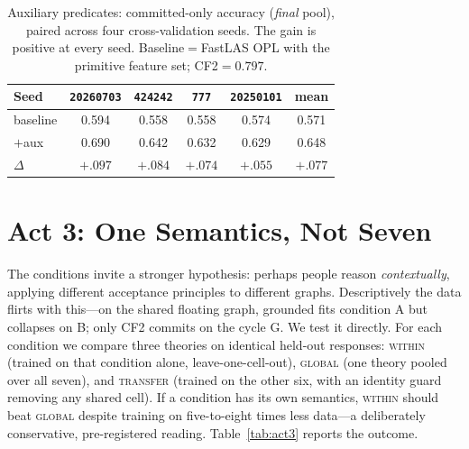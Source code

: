 \documentclass[11pt]{article}
\newcommand{\best}[1]{\textbf{#1}}
\begin{document}
\begin{table}[t]
\centering
\small
\caption{Auxiliary predicates: committed-only accuracy (\emph{final} pool), paired across four
cross-validation seeds. The gain is positive at every seed. Baseline$=$FastLAS OPL with the primitive
feature set; CF2$=0.797$.}
\label{tab:aux}
\begin{tabular}{lccccc}
\toprule
Seed & \texttt{20260703} & \texttt{424242} & \texttt{777} & \texttt{20250101} & mean\\
\midrule
baseline & 0.594 & 0.558 & 0.558 & 0.574 & 0.571\\
$+$aux   & 0.690 & 0.642 & 0.632 & 0.629 & 0.648\\
\midrule
$\Delta$ & $+.097$ & $+.084$ & $+.074$ & $+.055$ & \best{$+.077$}\\
\bottomrule
\end{tabular}
\end{table}

\section{Act 3: One Semantics, Not Seven}
\label{sec:act3}

The conditions invite a stronger hypothesis: perhaps people reason \emph{contextually}, applying
different acceptance principles to different graphs. Descriptively the data flirts with this---on
the shared floating graph, grounded fits condition A but collapses on B; only CF2 commits on the
cycle G. We test it directly. For each condition we compare three theories on identical held-out
responses: \textsc{within} (trained on that condition alone, leave-one-cell-out), \textsc{global}
(one theory pooled over all seven), and \textsc{transfer} (trained on the other six, with an
identity guard removing any shared cell). If a condition has its own semantics, \textsc{within}
should beat \textsc{global} despite training on five-to-eight times less data---a deliberately
conservative, pre-registered reading. Table~\ref{tab:act3} reports the outcome.
\end{document}
